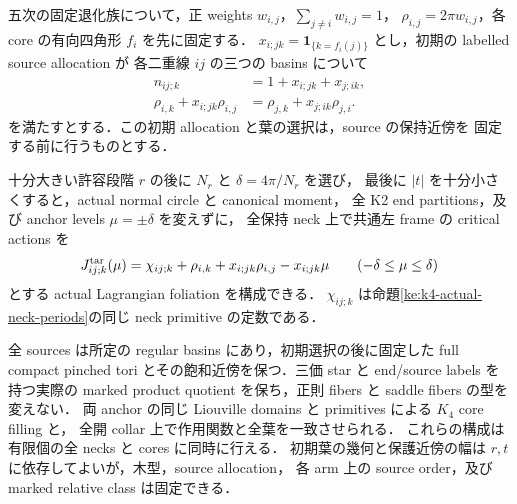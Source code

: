 \begin{theorem}
\label{ng8:quintic-full-moment}
五次の固定退化族について，正 weights $w_{i,j}$，$\sum_{j\ne i}w_{i,j}=1$，
$\rho_{i,j}=2\pi w_{i,j}$，各 core の有向四角形 $f_i$ を先に固定する．
$x_{i;jk}=\mathbf1_{\{k=f_i(j)\}}$ とし，初期の labelled source allocation が
各二重線 $ij$ の三つの basins について
\begin{align}
 n_{ij;k}&=1+x_{i;jk}+x_{j;ik},\label{ng8:eq:full-moment-counts}\\
 \rho_{i,k}+x_{i;jk}\rho_{i,j}
   &=\rho_{j,k}+x_{j;ik}\rho_{j,i}.\label{ng8:eq:full-moment-intercepts}
\end{align}
を満たすとする．この初期 allocation と葉の選択は，source の保持近傍を
固定する前に行うものとする．

十分大きい許容段階 $r$ の後に $N_r$ と $\delta=4\pi/N_r$ を選び，
最後に $|t|$ を十分小さくすると，actual normal circle と canonical moment，
全 K2 end partitions，及び anchor levels $\mu=\pm\delta$ を変えずに，
全保持 neck 上で共通左 frame の critical actions を
\begin{equation}\label{ng8:eq:full-moment-actions}
 J_{ij;k}^{\rm tar}(\mu)
 =\chi_{ij;k}+\rho_{i,k}+x_{i;jk}\rho_{i,j}-x_{i;jk}\mu
 \qquad(-\delta\le\mu\le\delta)
\end{equation}
とする actual Lagrangian foliation を構成できる．
$\chi_{ij;k}$ は命題\ref{ke:k4-actual-neck-periods}の同じ neck primitive の定数である．

全 sources は所定の regular basins にあり，初期選択の後に固定した full compact
pinched tori とその飽和近傍を保つ．三価 star と end/source labels を持つ実際の
marked product quotient を保ち，正則 fibers と saddle fibers の型を変えない．
両 anchor の同じ Liouville domains と primitives による $K_4$ core filling と，
全開 collar 上で作用関数と全葉を一致させられる．
これらの構成は有限個の全 necks と cores に同時に行える．
初期葉の幾何と保護近傍の幅は $r,t$ に依存してよいが，木型，source allocation，
各 arm 上の source order，及び marked relative class は固定できる．
\end{theorem}

